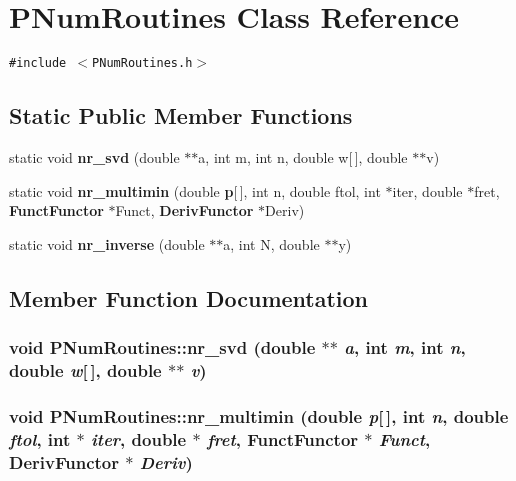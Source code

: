 \section{PNum\-Routines Class Reference}
\label{classPNumRoutines}
{\tt \#include $<$PNum\-Routines.h$>$}

\subsection*{Static Public Member Functions}
\begin{CompactItemize}
\item 
static void {\bf nr\_\-svd} (double $\ast$$\ast$a, int m, int n, double w[$\,$], double $\ast$$\ast$v)
\item 
static void {\bf nr\_\-multimin} (double {\bf p}[$\,$], int n, double ftol, int $\ast$iter, double $\ast$fret, {\bf Funct\-Functor} $\ast$Funct, {\bf Deriv\-Functor} $\ast$Deriv)
\item 
static void {\bf nr\_\-inverse} (double $\ast$$\ast$a, int N, double $\ast$$\ast$y)
\end{CompactItemize}


\subsection{Member Function Documentation}
\subsubsection{\setlength{\rightskip}{0pt plus 5cm}void PNum\-Routines::nr\_\-svd (double $\ast$$\ast$ {\em a}, int {\em m}, int {\em n}, double {\em w}[$\,$], double $\ast$$\ast$ {\em v})\hspace{0.3cm}{\tt  [static]}}\label{classPNumRoutines_8831d17e364b89b470d88935e4d09611}


\subsubsection{\setlength{\rightskip}{0pt plus 5cm}void PNum\-Routines::nr\_\-multimin (double {\em p}[$\,$], int {\em n}, double {\em ftol}, int $\ast$ {\em iter}, double $\ast$ {\em fret}, {\bf Funct\-Functor} $\ast$ {\em Funct}, {\bf Deriv\-Functor} $\ast$ {\em Deriv})\hspace{0.3cm}{\tt  [static]}}\label{classPNumRoutines_9e3fed96dd55ec9fbe70dca3e30f009f}


